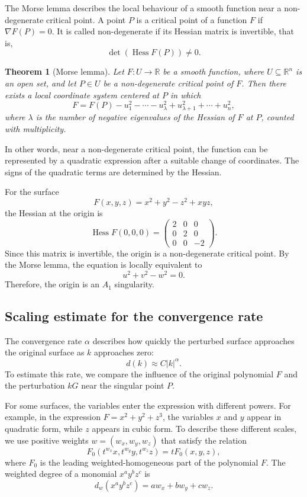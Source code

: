 \documentclass[12pt, a4paper]{article}
\theoremstyle{plain}
\newtheorem{theorem}{Theorem}[section]
\theoremstyle{definition}
\theoremstyle{remark}
\theoremstyle{definition}
\begin{document}
The Morse lemma describes the local behaviour of a smooth function
near a non-degenerate critical point. A point $P$ is a critical point
of a function $F$ if $\nabla F(P)=0$. It is called non-degenerate if
its Hessian matrix is invertible, that is,
\[
\det(\operatorname{Hess}F(P))\neq 0.
\]

\begin{theorem}[Morse lemma]
Let $F:U\to\mathbb R$ be a smooth function, where
$U\subseteq\mathbb R^n$ is an open set, and let $P\in U$
be a non-degenerate critical point of $F$. Then there
exists a local coordinate system centered at $P$ in which
\[
F=F(P)-u_1^2-\cdots-u_\lambda^2
+u_{\lambda+1}^2+\cdots+u_n^2,
\]
where $\lambda$ is the number of negative eigenvalues of
the Hessian of $F$ at $P$, counted with multiplicity.
\end{theorem}

In other words, near a non-degenerate critical point, the function
can be represented by a quadratic expression after a suitable
change of coordinates. The signs of the quadratic terms are
determined by the Hessian.

For the surface
\[
F(x,y,z)=x^2+y^2-z^2+xyz,
\]
the Hessian at the origin is
\[
\operatorname{Hess}F(0,0,0)=
\begin{pmatrix}
2&0&0\\
0&2&0\\
0&0&-2
\end{pmatrix}.
\]
Since this matrix is invertible, the origin is a non-degenerate
critical point. By the Morse lemma, the equation is locally
equivalent to
\[
u^2+v^2-w^2=0.
\]
Therefore, the origin is an $A_1$ singularity.
\cite{milnor1963morse}


\subsection{Scaling estimate for the convergence rate}
\label{sec:r-scaling}

The convergence rate $\alpha$ describes how quickly the perturbed surface approaches the original surface as $k$ approaches zero:
\[
d(k)\approx C|k|^\alpha.
\]
To estimate this rate, we compare the influence of the original polynomial $F$ and the perturbation $kG$ near the singular point $P$.

For some surfaces, the variables enter the expression with different powers. 
For example, in the expression $F=x^2+y^2+z^3$, the variables $x$ and $y$ appear in quadratic form, while $z$ appears in cubic form. 
To describe these different scales, we use positive weights $w=(w_x,w_y,w_z)$ that satisfy the relation
\[
F_0(t^{w_x}x,t^{w_y}y,t^{w_z}z)
=tF_0(x,y,z),
\]
where $F_0$ is the leading weighted-homogeneous part of the polynomial $F$.
The weighted degree of a monomial $x^ay^bz^c$ is
\[
d_w(x^ay^bz^c)=aw_x+bw_y+cw_z.
\]
\end{document}

